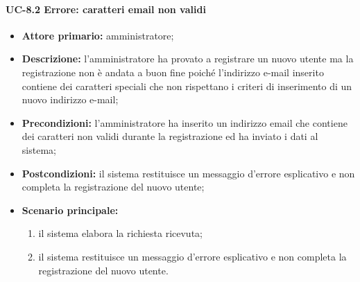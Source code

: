     \paragraph{UC-8.2 Errore: caratteri email non validi}
    \begin{itemize}
        \item \textbf{Attore primario:} amministratore;
    
        \item \textbf{Descrizione:} l'amministratore ha provato a registrare un nuovo utente ma la registrazione non è andata a buon fine poiché l'indirizzo e-mail inserito contiene dei caratteri speciali che non rispettano i criteri di inserimento di un nuovo indirizzo e-mail;
    
        \item \textbf{Precondizioni:} l'amministratore ha inserito un indirizzo email che contiene dei caratteri non validi durante la registrazione ed ha inviato i dati al sistema;
    
        \item \textbf{Postcondizioni:} il sistema restituisce un messaggio d'errore esplicativo e non completa la registrazione del nuovo utente;
    
        \item \textbf{Scenario principale:}
              \begin{enumerate}
                  \item il sistema elabora la richiesta ricevuta;
                  \item il sistema restituisce un messaggio d'errore esplicativo e non completa la registrazione del nuovo utente.
              \end{enumerate}
    \end{itemize}

